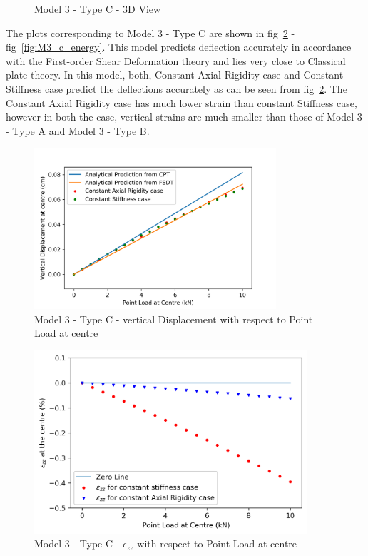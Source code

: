 \begin{figure}[!htbp]
\begin{minipage}{0.3\textwidth}
    \caption{Model 3 - Type C - 3D View}
    \label{fig:M3_c_3D}
\end{minipage}
\end{figure}

The plots corresponding to Model 3 - Type C are shown in fig~\ref{fig:M3_c_plt} - fig~\ref{fig:M3_c_energy}. This model predicts deflection accurately in accordance with the First-order Shear Deformation theory and lies very close to Classical plate theory. In this model, both, Constant Axial Rigidity case and Constant Stiffness case predict the deflections accurately as can be seen from fig~\ref{fig:M3_c_plt}. The Constant Axial Rigidity case has much lower strain than constant Stiffness case, however in both the case, vertical strains are much smaller than those of Model 3 - Type A and Model 3 - Type B.

\begin{figure}[!htbp]
    \centering
    \includegraphics[width = 0.8\textwidth]{Figures/M3_c_plt.png}
    \caption{Model 3 - Type C - vertical Displacement with respect to Point Load at centre}
    \label{fig:M3_c_plt}
\end{figure}

\begin{figure}[!htbp]
    \centering
    \includegraphics[width = 0.9\textwidth]{Figures/M3_c_strain.png}
    \caption{Model 3 - Type C - $\epsilon_{zz}$ with respect to Point Load at centre}
    \label{fig:M3_c_strain_plt}
\end{figure}

